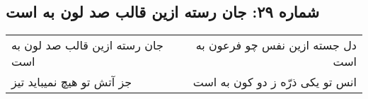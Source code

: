 \begin{center}
\section*{شماره ۲۹: جان رسته ازین قالب صد لون به است}
\label{sec:029}
\begin{longtable}{l p{0.5cm} r}
جان رسته ازین قالب صد لون به است
&&
دل جسته ازین نفس چو فرعون به است
\\
جز آتش تو هیچ نمیباید تیز
&&
انس تو یکی ذرّه ز دو کون به است
\\
\end{longtable}
\end{center}
